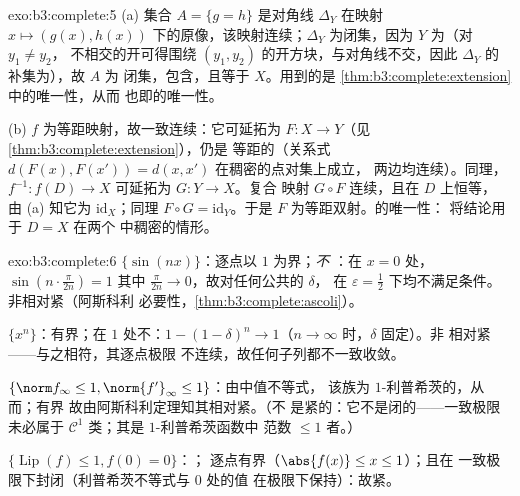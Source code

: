\begin{solution}{exo:b3:complete:5}
(a) 集合 $A = \{g = h\}$ 是对角线
$\Delta_Y$ 在映射 $x \mapsto (g(x), h(x))$ 下的原像，该映射连续；$\Delta_Y$
为闭集，因为 $Y$ 为（对 $y_1 \neq y_2$，
不相交的开可得围绕 $(y_1,
y_2)$ 的开方块，与对角线不交，因此
$\Delta_Y$ 的补集为），故 $A$ 为
闭集，包含，且等于 $X$。用到的是
\cref{thm:b3:complete:extension} 中的唯一性，从而
也即的唯一性。

(b) $f$ 为等距映射，故一致连续：它可延拓为
$F\colon X \to Y$（见\cref{thm:b3:complete:extension}），仍是
等距的（关系式 $d(F(x), F(x')) = d(x, x')$ 在稠密的点对集上成立，
两边均连续）。同理，
$f^{-1}\colon f(D) \to X$ 可延拓为 $G \colon Y \to X$。复合
映射 $G \circ F$ 连续，且在 $D$ 上恒等，
由 (a) 知它为 $\mathrm{id}_X$；同理 $F \circ G =
\mathrm{id}_Y$。于是 $F$ 为等距双射。的唯一性：
将结论用于 $D = X$ 在两个
中稠密的情形。
\end{solution}

\begin{solution}{exo:b3:complete:6}
$\{\sin(nx)\}$：逐点以 $1$ 为界；\emph{不}
：在 $x = 0$ 处，$\sin(n\cdot\frac{\pi}{2n}) = 1$
其中 $\frac\pi{2n} \to 0$，故对任何公共的 $\delta$，
在 $\varepsilon = \frac12$ 下均不满足条件。非相对紧（阿斯科利
必要性，\cref{thm:b3:complete:ascoli}）。

$\{x^n\}$：有界；在 $1$ 处不：$1 - (1 -
\delta)^n \to 1$（$n \to \infty$ 时，$\delta$ 固定）。非
相对紧——与之相符，其逐点极限
不连续，故任何子列都不一致收敛。

$\{\norm f_\infty \leq 1, \norm{f'}_\infty \leq 1\}$：由中值不等式，
该族为 $1$-利普希茨的，从而；有界
故由阿斯科利定理知其相对紧。（不
是紧的：它不是闭的——一致极限未必属于
$\mathcal C^1$ 类；其是 $1$-利普希茨函数中
范数 $\leq 1$ 者。）

$\{\operatorname{Lip}(f) \leq 1, f(0) = 0\}$：；
逐点有界（$\abs{f(x)} \leq x \leq 1$）；且在
一致极限下封闭（利普希茨不等式与 $0$ 处的值
在极限下保持）：故紧。
\end{solution}

